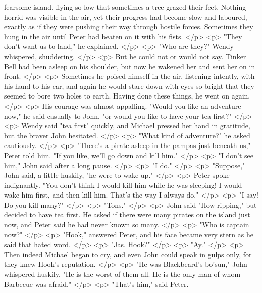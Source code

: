       fearsome island, flying so low that sometimes a tree grazed their feet.
      Nothing horrid was visible in the air, yet their progress had become slow
      and laboured, exactly as if they were pushing their way through hostile
      forces. Sometimes they hung in the air until Peter had beaten on it with
      his fists.
    </p>
    <p>
      "They don't want us to land," he explained.
    </p>
    <p>
      "Who are they?" Wendy whispered, shuddering.
    </p>
    <p>
      But he could not or would not say. Tinker Bell had been asleep on his
      shoulder, but now he wakened her and sent her on in front.
    </p>
    <p>
      Sometimes he poised himself in the air, listening intently, with his hand
      to his ear, and again he would stare down with eyes so bright that they
      seemed to bore two holes to earth. Having done these things, he went on
      again.
    </p>
    <p>
      His courage was almost appalling. "Would you like an adventure now," he
      said casually to John, "or would you like to have your tea first?"
    </p>
    <p>
      Wendy said "tea first" quickly, and Michael pressed her hand in gratitude,
      but the braver John hesitated.
    </p>
    <p>
      "What kind of adventure?" he asked cautiously.
    </p>
    <p>
      "There's a pirate asleep in the pampas just beneath us," Peter told him.
      "If you like, we'll go down and kill him."
    </p>
    <p>
      "I don't see him," John said after a long pause.
    </p>
    <p>
      "I do."
    </p>
    <p>
      "Suppose," John said, a little huskily, "he were to wake up."
    </p>
    <p>
      Peter spoke indignantly. "You don't think I would kill him while he was
      sleeping! I would wake him first, and then kill him. That's the way I
      always do."
    </p>
    <p>
      "I say! Do you kill many?"
    </p>
    <p>
      "Tons."
    </p>
    <p>
      John said "How ripping," but decided to have tea first. He asked if there
      were many pirates on the island just now, and Peter said he had never
      known so many.
    </p>
    <p>
      "Who is captain now?"
    </p>
    <p>
      "Hook," answered Peter, and his face became very stern as he said that
      hated word.
    </p>
    <p>
      "Jas. Hook?"
    </p>
    <p>
      "Ay."
    </p>
    <p>
      Then indeed Michael began to cry, and even John could speak in gulps only,
      for they knew Hook's reputation.
    </p>
    <p>
      "He was Blackbeard's bo'sun," John whispered huskily. "He is the worst of
      them all. He is the only man of whom Barbecue was afraid."
    </p>
    <p>
      "That's him," said Peter.
